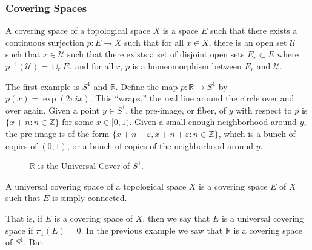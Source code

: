 \documentclass[crop=false,class=book,oneside]{standalone}                      %
\begin{document}
        \subsubsection{Covering Spaces}
            \begin{definition}
                A covering space of a topological space $X$ is a space $E$ such
                that there exists a continuous surjection $p:E\rightarrow{X}$
                such that for all $x\in{X}$, there is an open set $\mathcal{U}$
                such that $x\in\mathcal{U}$ such that there exists a set of
                disjoint open sets $E_{r}\subset{E}$ where
                $p^{-1}(\mathcal{U})=\cup_{r}E_{r}$ and for all $r$, $p$ is a
                homeomorphism between $E_{r}$ and $\mathcal{U}$.
            \end{definition}
            \begin{example}
                The first example is $S^{1}$ and $\mathbb{R}$. Define the map
                $p:\mathbb{R}\rightarrow{S^{1}}$ by $p(x)=\exp(2\pi{i}x)$. This
                ``wraps,'' the real line around the circle over and over again.
                Given a point $y\in{S^{1}}$, the pre-image, or fiber, of $y$
                with respect to $p$ is $\{x+n:n\in\mathbb{Z}\}$ for some
                $x\in[0,1)$. Given a small enough neighborhood around $y$, the
                pre-image is of the form
                $\{x+n-\varepsilon,x+n+\varepsilon:n\in\mathbb{Z}\}$,
                which is a bunch of copies of $(0,1)$, or a bunch
                of copies of the neighborhood around $y$.
            \end{example}
            \begin{figure}[H]
                \centering
                \captionsetup{type=figure}
                
                \caption{$\mathbb{R}$ is the Universal Cover of $S^{1}$.}
                \label{fig:Reals_Cover_Circle}
            \end{figure}
            \begin{definition}
                A universal covering space of a topological space $X$
                is a covering space $E$ of $X$ such that
                $E$ is simply connected.
            \end{definition}
            That is, if $E$ is a covering space of $X$, then we say
            that $E$ is a universal covering space if
            $\pi_{1}(E)=0$. In the previous example we saw that
            $\mathbb{R}$ is a covering space of $S^{1}$. But
\end{document}
